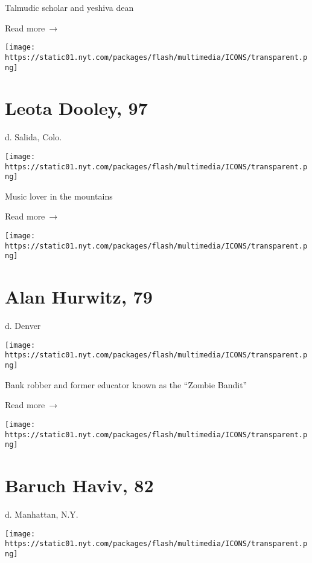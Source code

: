 Talmudic scholar and yeshiva dean

 Read more~→

\href{https://www.nytimes.com/2020/06/16/obituaries/leota-dooley-dead-coronavirus.html}{}

\texttt{[image: https://static01.nyt.com/packages/flash/multimedia/ICONS/transparent.png]}

\hypertarget{leota-dooley-97}{%
\section{Leota Dooley, 97}\label{leota-dooley-97}}

d. Salida, Colo.

\texttt{[image: https://static01.nyt.com/packages/flash/multimedia/ICONS/transparent.png]}

Music lover in the mountains

 Read more~→

\href{https://www.nytimes.com/2020/06/15/obituaries/alan-hurwitz-dead-coronavirus.html}{}

\texttt{[image: https://static01.nyt.com/packages/flash/multimedia/ICONS/transparent.png]}

\hypertarget{alan-hurwitz-79}{%
\section{Alan Hurwitz, 79}\label{alan-hurwitz-79}}

d. Denver

\texttt{[image: https://static01.nyt.com/packages/flash/multimedia/ICONS/transparent.png]}

Bank robber and former educator known as the ``Zombie Bandit''

 Read more~→

\href{https://www.nytimes.com/2020/06/15/nyregion/baruch-haviv-dead-coronavirus.html}{}

\texttt{[image: https://static01.nyt.com/packages/flash/multimedia/ICONS/transparent.png]}

\hypertarget{baruch-haviv-82}{%
\section{Baruch Haviv, 82}\label{baruch-haviv-82}}

d. Manhattan, N.Y.

\texttt{[image: https://static01.nyt.com/packages/flash/multimedia/ICONS/transparent.png]}

